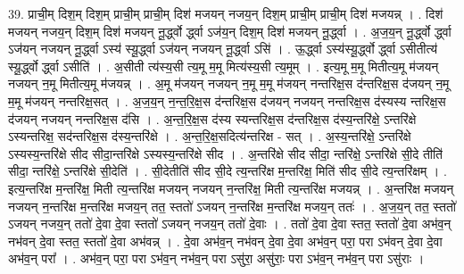 \documentclass[17pt]{extarticle}
\begin{document}
39. प्राची॒म् दिश॒म् दिश॒म् प्राची॒म् प्राची॒म् दिश॑ मजयन् नजय॒न् दिश॒म् प्राची॒म् प्राची॒म् दिश॑ मजयन्न् । . दिश॑ मजयन् नजय॒न् दिश॒म् दिश॑ मजयन् नू॒र्द्ध्वो र्द्ध्वा ऽज॑य॒न् दिश॒म् दिश॑ मजयन् नू॒र्द्ध्वा । . अ॒ज॒य॒न् नू॒र्द्ध्वो र्द्ध्वा ऽज॑यन् नजयन् नू॒र्द्ध्वा ऽस्य॑ स्यू॒र्द्ध्वा ऽज॑यन् नजयन् नू॒र्द्ध्वा ऽसि॑ । . ऊ॒र्द्ध्वा ऽस्य॑स्यू॒र्द्ध्वो र्द्ध्वा ऽसीतीत्य॑ स्यू॒र्द्ध्वो र्द्ध्वा ऽसीति॑ । . अ॒सीती त्य॑स्य॒सी त्य॒मू म॒मू मित्य॑स्य॒सी त्य॒मूम् । . इत्य॒मू म॒मू मितीत्य॒मू म॑जयन् नजयन् न॒मू मितीत्य॒मू म॑जयन्न् । . अ॒मू म॑जयन् नजयन् न॒मू म॒मू म॑जयन् नन्तरिक्ष॒स द॑न्तरिक्ष॒स द॑जयन् न॒मू म॒मू म॑जयन् नन्तरिक्ष॒सत् । . अ॒ज॒य॒न् न॒न्त॒रि॒क्ष॒स द॑न्तरिक्ष॒स द॑जयन् नजयन् नन्तरिक्ष॒स द॑स्यस्य न्तरिक्ष॒स द॑जयन् नजयन् नन्तरिक्ष॒स द॑सि । . अ॒न्त॒रि॒क्ष॒स द॑स्य स्यन्तरिक्ष॒स द॑न्तरिक्ष॒स द॑स्य॒न्तरि॑क्षे॒ ऽन्तरि॑क्षे ऽस्यन्तरिक्ष॒ सद॑न्तरिक्ष॒स द॑स्य॒न्तरि॑क्षे । . अ॒न्त॒रि॒क्ष॒सदित्य॑न्तरिक्ष - सत् । . अ॒स्य॒न्तरि॑क्षे॒ ऽन्तरि॑क्षे ऽस्यस्य॒न्तरि॑क्षे सीद सीदा॒न्तरि॑क्षे ऽस्यस्य॒न्तरि॑क्षे सीद । . अ॒न्तरि॑क्षे सीद सीदा॒ न्तरि॑क्षे॒ ऽन्तरि॑क्षे सी॒दे तीति॑ सीदा॒ न्तरि॑क्षे॒ ऽन्तरि॑क्षे सी॒देति॑ । . सी॒देतीति॑ सीद सी॒दे त्य॒न्तरि॑क्ष म॒न्तरि॑क्ष॒ मिति॑ सीद सी॒दे त्य॒न्तरि॑क्षम् । . इत्य॒न्तरि॑क्ष म॒न्तरि॑क्ष॒ मिती त्य॒न्तरि॑क्ष मजयन् नजयन् न॒न्तरि॑क्ष॒ मिती त्य॒न्तरि॑क्ष मजयन्न् । . अ॒न्तरि॑क्ष मजयन् नजयन् न॒न्तरि॑क्ष म॒न्तरि॑क्ष मजय॒न् तत॒ स्ततो॑ ऽजयन् न॒न्तरि॑क्ष म॒न्तरि॑क्ष मजय॒न् ततः॑ । . अ॒ज॒य॒न् तत॒ स्ततो॑ ऽजयन् नजय॒न् ततो॑ दे॒वा दे॒वा स्ततो॑ ऽजयन् नजय॒न् ततो॑ दे॒वाः । . ततो॑ दे॒वा दे॒वा स्तत॒ स्ततो॑ दे॒वा अभ॑व॒न् नभ॑वन् दे॒वा स्तत॒ स्ततो॑ दे॒वा अभ॑वन्न् । . दे॒वा अभ॑व॒न् नभ॑वन् दे॒वा दे॒वा अभ॑व॒न् परा॒ परा ऽभ॑वन् दे॒वा दे॒वा अभ॑व॒न् परा᳚ । . अभ॑व॒न् परा॒ परा ऽभ॑व॒न् नभ॑व॒न् परा ऽसु॑रा॒ असु॑राः॒ परा ऽभ॑व॒न् नभ॑व॒न् परा ऽसु॑राः । \newline
\pagebreak
{}
\end{document}
